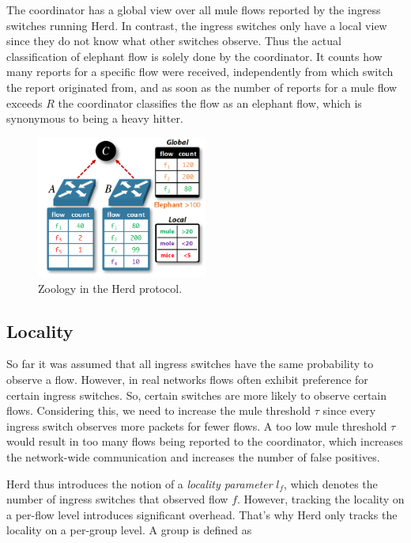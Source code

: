 \documentclass[11pt,oneside,a4paper]{article}
\begin{document}
\newpage

The coordinator has a global view over all mule flows reported by the ingress switches running Herd. In contrast, the ingress switches only have a local view since they do not know what other switches observe. Thus the actual classification of elephant flow is solely done by the coordinator. It counts how many reports for a specific flow were received, independently from which switch the report originated from, and as soon as the number of reports for a mule flow exceeds $R$ the coordinator classifies the flow as an elephant flow, which is synonymous to being a heavy hitter.

\begin{figure}
	\centering
	\includegraphics[width=0.5\textwidth, scale=1]{figures/paper_zoo}
	\caption{Zoology in the Herd protocol. \cite{anon2019herd}}
	\label{fig:zoo_fig}
\end{figure}

\subsection{Locality} \label{locality}
So far it was assumed that all ingress switches have the same probability to observe a flow. However, in real networks flows often exhibit preference for certain ingress switches. So, certain switches are more likely to observe certain flows. Considering this, we need to increase the mule threshold $\tau$ since every ingress switch observes more packets for fewer flows. A too low mule threshold $\tau$ would result in too many flows being reported to the coordinator, which increases the network-wide communication and increases the number of false positives.

Herd thus introduces the notion of a \textit{locality parameter} $l_f$, which denotes the number of ingress switches that observed flow $f$. However, tracking the locality on a per-flow level introduces significant overhead. That's why Herd only tracks the locality on a per-group level. A group is defined as
\end{document}
